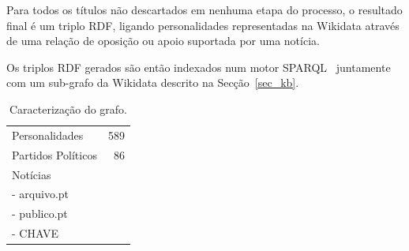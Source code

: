 \documentclass[a4paper, twocolumn, 11pt, twoside]{article}
\begin{document}
{Para todos os títulos não descartados em nenhuma etapa do processo, o resultado final é um triplo RDF, ligando personalidades representadas na Wikidata através de uma relação de oposição ou apoio suportada por uma notícia.

Os triplos RDF gerados são então indexados num motor SPARQL~\citep{jena2015free} juntamente com um sub-grafo da Wikidata descrito na Secção~\ref{sec_kb}.


\begin{table}[!h]
    \begin{center}
    \begin{tabular}{l r}
        \hline
        Personalidades 	 	& 589 \\
		Partidos Políticos	&  86 \\
		Notícias			& \\
			- arquivo.pt	& \\
			- publico.pt    & \\
			- CHAVE			& \\
		\hline
    \end{tabular}
	\caption{Caracterização do grafo.}
	\label{tab:grafo}
	\end{center}
\end{table}


}
\end{document}
